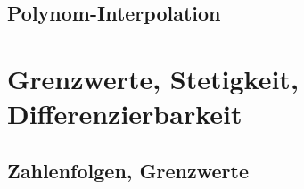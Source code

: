 \newpage
{}


\subsection{Polynom-Interpolation}

\section{Grenzwerte, Stetigkeit, Differenzierbarkeit}
\subsection{Zahlenfolgen, Grenzwerte}